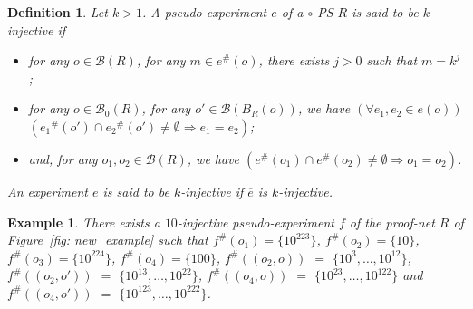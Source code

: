 \documentclass{article}
\theoremstyle{plain}
\newtheorem{definition}{Definition}
\newtheorem{example}{Example}
\newcommand{\boxes}[1]{\mathcal{B}(#1)}
\newcommand{\boxesatzero}[1]{\mathcal{B}_{0}(#1)}
\begin{document}
\begin{definition}\label{defin: k-injective}
Let $k > 1$. A pseudo-experiment $e$ of a $\circ$-PS $R$ is said to be \emph{$k$-injective} if
\begin{itemize}
\item for any $o \in \boxes{R}$, for any $m \in e^\#(o)$, there exists $j > 0$ such that $m = k^j$;
\item for any $o \in \boxesatzero{R}$, for any $o' \in \boxes{B_R(o)}$, we have $(\forall e_1, e_2 \in e(o))$ $({e_1}^\#(o') \cap {e_2}^\#(o') \not= \emptyset \Rightarrow e_1 = e_2)$;
\item and, for any $o_1, o_2 \in \boxes{R}{}$, we have $({e}^\#(o_1) \cap {e}^\#(o_2) \not= \emptyset \Rightarrow o_1 = o_2)$.
\end{itemize}
An experiment $e$ is said to be \emph{$k$-injective} if $\overline{e}$ is $k$-injective.
\end{definition}

\begin{example}\label{example: pseudo}
There exists a $10$-injective pseudo-experiment $f$ of the proof-net $R$ of Figure~\ref{fig: new_example} such that
$f^\#(o_1) = \{ 10^{223} \}$, 
$f^\#(o_2) = \{ 10 \}$, 
$f^\#(o_3) = \{ 10^{224} \}$, 
$f^\#(o_4) = \{ 100 \}$, 
$f^\#((o_2, o))$ $=$ $\{ 10^3, \ldots, 10^{12} \}$, 
$f^\#((o_2, o'))$ $=$ $\{ 10^{13}, \ldots, 10^{22} \}$, 
$f^\#((o_4, o))$ $=$ $\{ 10^{23}, \ldots, 10^{122} \}$ 
and $f^\#((o_4, o'))$ $=$ $\{ 10^{123}, \ldots, 10^{222} \}$.
\end{example}
\end{document}
